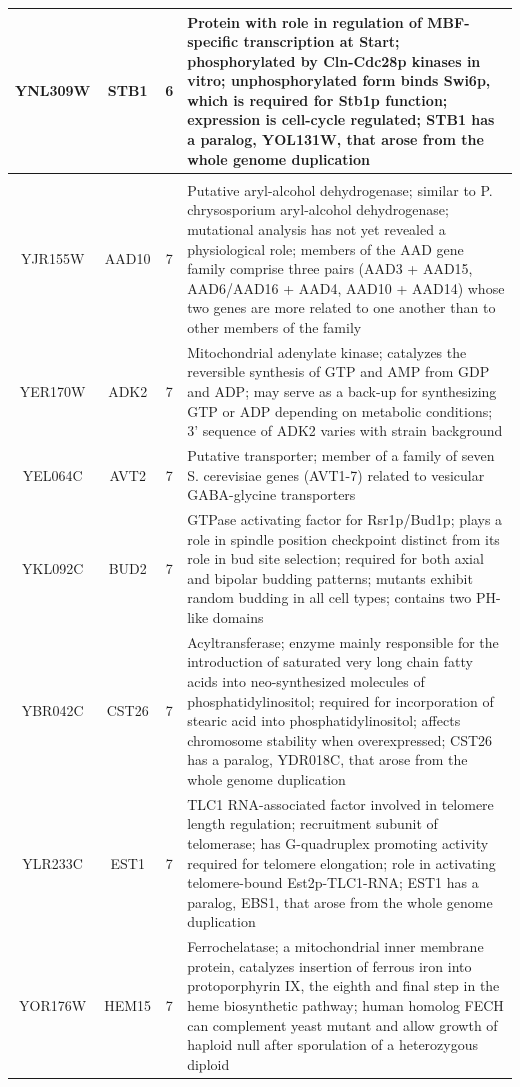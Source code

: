 \documentclass[]{article}
\begin{document}
\begin{longtable}{@{\extracolsep{3pt}} cccp{85mm}}
YNL309W & STB1 & 6 & Protein with role in regulation of MBF-specific transcription at Start; phosphorylated by Cln-Cdc28p kinases in vitro; unphosphorylated form binds Swi6p, which is required for Stb1p function; expression is cell-cycle regulated; STB1 has a paralog, YOL131W, that arose from the whole genome duplication \\   \hline \\ [-1.8ex] 
YJR155W & AAD10 & 7 & Putative aryl-alcohol dehydrogenase; similar to P. chrysosporium aryl-alcohol dehydrogenase; mutational analysis has not yet revealed a physiological role; members of the AAD gene family comprise three pairs (AAD3 + AAD15, AAD6/AAD16 + AAD4, AAD10 + AAD14) whose two genes are more related to one another than to other members of the family \\ 
YER170W & ADK2 & 7 & Mitochondrial adenylate kinase; catalyzes the reversible synthesis of GTP and AMP from GDP and ADP; may serve as a back-up for synthesizing GTP or ADP depending on metabolic conditions; 3' sequence of ADK2 varies with strain background \\ 
YEL064C & AVT2 & 7 & Putative transporter; member of a family of seven S. cerevisiae genes (AVT1-7) related to vesicular GABA-glycine transporters \\ 
YKL092C & BUD2 & 7 & GTPase activating factor for Rsr1p/Bud1p; plays a role in spindle position checkpoint distinct from its role in bud site selection; required for both axial and bipolar budding patterns; mutants exhibit random budding in all cell types; contains two PH-like domains \\ 
YBR042C & CST26 & 7 & Acyltransferase; enzyme mainly responsible for the introduction of saturated very long chain fatty acids into neo-synthesized molecules of phosphatidylinositol; required for incorporation of stearic acid into phosphatidylinositol; affects chromosome stability when overexpressed; CST26 has a paralog, YDR018C, that arose from the whole genome duplication \\ 
YLR233C & EST1 & 7 & TLC1 RNA-associated factor involved in telomere length regulation; recruitment subunit of telomerase; has G-quadruplex promoting activity required for telomere elongation; role in activating telomere-bound Est2p-TLC1-RNA; EST1 has a paralog, EBS1, that arose from the whole genome duplication \\ 
YOR176W & HEM15 & 7 & Ferrochelatase; a mitochondrial inner membrane protein, catalyzes insertion of ferrous iron into protoporphyrin IX, the eighth and final step in the heme biosynthetic pathway; human homolog FECH can complement yeast mutant and allow growth of haploid null after sporulation of a heterozygous diploid \\ 

\end{longtable}
\end{document}
